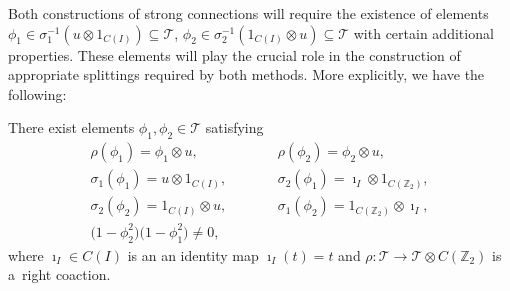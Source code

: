 \documentclass[pdftex]{sigma}
\begin{document}
Both constructions of strong connections will require the existence of elements $\phi_1\in\sigma_1^{-1}(u\otimes
1_{C(I)})\subseteq{\mathcal{T}}$, $\phi_2\in\sigma_2^{-1}(1_{C(I)}\otimes u)\subseteq{\mathcal{T}}$ with certain
additional properties.
These elements will play the crucial role in the construction of appropriate splittings required by both methods.
More explicitly, we have the following:

\begin{lemma}
There exist elements $\phi_1,\phi_2\in {\mathcal{T}}$ satisfying
\begin{subequations}
\label{phiprop2}
\begin{alignat}{3}
& \rho(\phi_1)=\phi_1\otimes u,
\qquad &&
\rho(\phi_2)=\phi_2\otimes u, &
\label{phiprop2a}
\\
& \sigma_1(\phi_1)=u\otimes 1_{C(I)},
\qquad &&
\sigma_2(\phi_1)=\imath_I\otimes 1_{C({\mathbb Z_2})},&
\label{phiprop2ba}
\\
& \sigma_2(\phi_2)=1_{C(I)}\otimes u,
\qquad &&
\sigma_1(\phi_2)=1_{C({\mathbb Z_2})}\otimes \imath_I,&
\label{phiprop2b}
\\
& \big(1-\phi_2^2\big)\big(1-\phi_1^2\big)\neq0,\qquad &&&
\label{phiprop2c}
\end{alignat}
\end{subequations}
where $\imath_I\in C(I)$ is an an identity map $\imath_I(t)=t$ and $\rho:{\mathcal{T}}\rightarrow {\mathcal{T}}\otimes
C({\mathbb Z_2})$ is a~right coaction.
\end{lemma}
\end{document}
